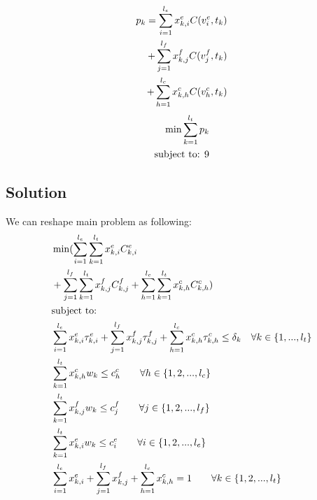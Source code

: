 \documentclass[conference]{IEEEtran}
\begin{document}
    \begin{subequations}
        \begin{align}
          p_k = \sum_{i=1}^{l_e}x_{k,i}^e C(v_i^e, t_k) \\ \notag
          +\sum_{j=1}^{l_f}x_{k,j}^f C(v_j^f, t_k) \\ \notag
          +\sum_{h=1}^{l_c}x_{k,h}^c C(v_h^c, t_k)
        \end{align}
    \end{subequations}
    \begin{subequations}
    \begin{align}
      \min{\sum_{k=1}^{l_t}{p_k}} \\ \notag
      \text{subject to: 9}
    \end{align}
    \end{subequations}

    \subsection{Solution}
    We can reshape main problem as following:
    \begin{subequations}
      \begin{align}
        &\min(\sum_{i=1}^{l_e} \sum_{k=1}^{l_t} x_{k,i}^e C_{k,i}^e \\ \notag
        &+\sum_{j=1}^{l_f} \sum_{k=1}^{l_t} x_{k,j}^f C_{k,j}^f
        +\sum_{h=1}^{l_c} \sum_{k=1}^{l_t} x_{k,h}^c C_{k,h}^c) \\ \notag
        &\text{subject to:} \\ \notag
        &\sum_{i=1}^{l_e}x_{k,i}^e\tau_{k,i}^e
        +\sum_{j=1}^{l_f}x_{k,j}^f\tau_{k,j}^f
        +\sum_{h=1}^{l_c}x_{k,h}^c\tau_{k,h}^c
        \le \delta_k \quad \forall k\in\{1,...,l_t\} \\ \notag
        &\sum_{k=1}^{l_t}x_{k,h}^c w_k \le c_h^c \quad\quad \forall h\in\{1,2,...,l_c\} \\ \notag
        &\sum_{k=1}^{l_t}x_{k,j}^f w_k \le c_j^f \quad\quad \forall j\in\{1,2,...,l_f\} \\ \notag
        &\sum_{k=1}^{l_t}x_{k,i}^e w_k \le c_i^e \quad\quad \forall i\in\{1,2,...,l_e\} \\ \notag
        &\sum_{i=1}^{l_e}x_{k,i}^e+\sum_{j=1}^{l_f}x_{k,j}^f+\sum_{h=1}^{l_c}x_{k,h}^c=1 \quad\quad
        \forall k\in\{1,2,...,l_t\} \\ \notag
      \end{align}
    \end{subequations}
\end{document}
